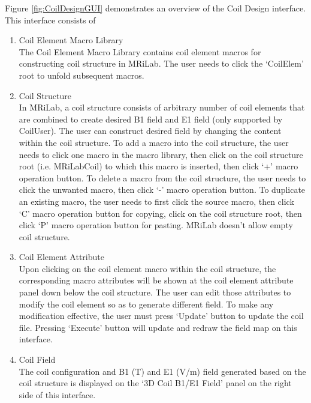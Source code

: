 \documentclass{book}%
\begin{document}
Figure \ref{fig:CoilDesignGUI} demonstrates an overview of the Coil Design interface. This interface consists of 

\begin{enumerate}
	\item Coil Element Macro Library \\
	
The Coil Element Macro Library contains coil element macros for constructing coil structure in MRiLab. The user needs to click the `CoilElem' root to unfold subsequent macros.

	\item Coil Structure \\
	
In MRiLab, a coil structure consists of arbitrary number of coil elements that are combined to create desired B1 field and E1 field (only supported by CoilUser). The user can construct desired field by changing the content within the coil structure. To add a macro into the coil structure, the user needs to click one macro in the macro library, then click on the coil structure root (i.e. MRiLabCoil) to which this macro is inserted, then click `+' macro operation button. To delete a macro from the coil structure, the user needs to click the unwanted macro, then click `-' macro operation button. To duplicate an existing macro, the user needs to first click the source macro, then click `C' macro operation button for copying, click on the coil structure root, then click `P' macro operation button for pasting. MRiLab doesn't allow empty coil structure.
	
	
	\item Coil Element Attribute \\
	
Upon clicking on the coil element macro within the coil structure, the corresponding macro attributes will be shown at the coil element attribute panel down below the coil structure. The user can edit those attributes to modify the coil element so as to generate different field. To make any modification effective, the user must press `Update' button to update the coil file. Pressing `Execute' button will update and redraw the field map on this interface.
	
	\item Coil Field \\

The coil configuration and B1 (T) and E1 (V/m) field generated based on the coil structure is displayed on the `3D Coil B1/E1 Field' panel on the right side of this interface.
	

\end{enumerate}
\end{document}
